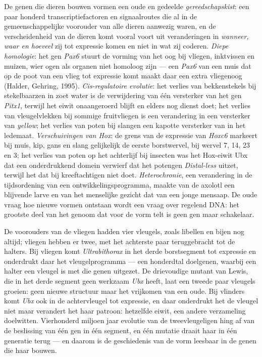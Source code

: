 \begin{definition}\label{def:b3:developmental-genetics:evodevo}
De genen die dieren bouwen vormen een oude en gedeelde
\emph{gereedschapskist}: een paar honderd transcriptiefactoren en
signaalroutes die al in de gemeenschappelijke voorouder van alle dieren
aanwezig waren, en de verscheidenheid van de dieren komt vooral voort
uit veranderingen in \emph{wanneer, waar en hoeveel} zij tot expressie
komen en niet in wat zij coderen. \emph{Diepe homologie}: het gen
\emph{Pax6} stuurt de vorming van het oog bij vliegen, inktvissen en
muizen, wier ogen als organen niet homoloog zijn --- een \emph{Pax6}
van een muis dat op de poot van een vlieg tot expressie komt maakt daar
een extra vliegenoog (Halder, Gehring, 1995). \emph{Cis-regulatoire
evolutie}: het verlies van bekkenstekels bij stekelbaarzen in zoet
water is de verwijdering van één versterker van het gen \emph{Pitx1},
terwijl het eiwit onaangeroerd blijft en elders nog dienst doet; het
verlies van vleugelvlekken bij sommige fruitvliegen is een verandering
in een versterker van \emph{yellow}; het verlies van poten bij slangen
een kapotte versterker van \emph{} in het ledemaat.
\emph{Verschuivingen van Hox}: de grens van de expressie van
\emph{Hoxc6} markeert bij muis, kip, gans en slang gelijkelijk de
eerste borstwervel, bij wervel 7, 14, 23 en 3; het verlies van poten op
het achterlijf bij insecten was het Hox-eiwit Ubx dat een onderdrukkend
domein verwierf dat het potengen \emph{Distal-less} uitzet, terwijl het
dat bij kreeftachtigen niet doet. \emph{Heterochronie}, een verandering
in de tijdsordening van een ontwikkelingsprogramma, maakte van de
axolotl een blijvende larve en van het menselijke gezicht dat van een
jonge mensaap. De oude vraag hoe nieuwe vormen ontstaan wordt een vraag
over regelend DNA: het grootste deel van het genoom dat voor de vorm
telt is geen gen maar schakelaar.
\end{definition}

\begin{example}\label{ex:b3:developmental-genetics:four-wings}
De voorouders van de vliegen hadden vier vleugels, zoals libellen en
bijen nog altijd; vliegen hebben er twee, met het achterste paar
teruggebracht tot de halters. Bij vliegen komt \emph{Ultrabithorax} in
het derde borstsegment tot expressie en onderdrukt daar het
vleugelprogramma --- een honderdtal doelgenen, waarbij een halter een
vleugel is met die genen uitgezet. De drievoudige mutant van Lewis, die
in het derde segment geen werkzaam \emph{Ubx} heeft, laat een tweede
paar vleugels groeien: geen nieuwe structuur maar het vrijkomen van een
oude. Bij vlinders komt \emph{Ubx} ook in de achtervleugel tot
expressie, en daar onderdrukt het de vleugel niet maar verandert het
haar patroon: hetzelfde eiwit, een andere verzameling doelwitten.
Vierhonderd miljoen jaar evolutie van de tweevleugeligen hing af van de
beslissing van één gen in één segment, en één mutatie draait haar in
één generatie terug --- en daarom is de geschiedenis van de vorm
leesbaar in de genen die haar bouwen.
\end{example}

